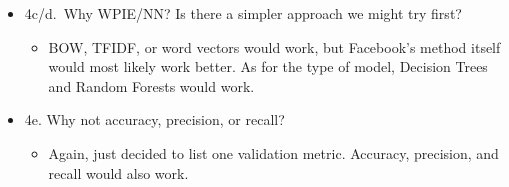 \documentclass[letterpaper]{article}
\begin{document}
\begin{itemize}
\item 4c/d. Why WPIE/NN? Is there a simpler approach we might try first?

\begin{itemize}
\item BOW, TFIDF, or word vectors would work, but Facebook's method itself
would most likely work better. As for the type of model, Decision
Trees and Random Forests would work.
\end{itemize}

\item 4e. Why not accuracy, precision, or recall?

\begin{itemize}
\item Again, just decided to list one validation metric. Accuracy,
precision, and recall would also work.
\end{itemize}
\end{itemize}
\end{document}
